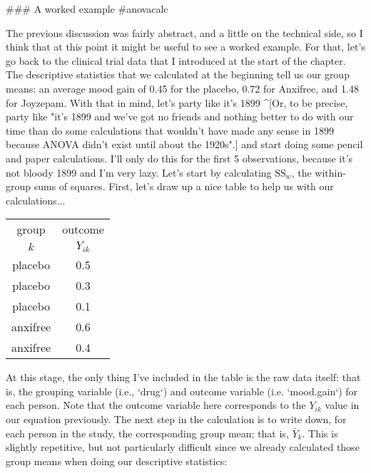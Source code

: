 ### A worked example {#anovacalc}


The previous discussion was fairly abstract, and a little on the technical side, so I think that at this point it might be useful to see a worked example. For that, let's go back to the clinical trial data that I introduced at the start of the chapter. The descriptive statistics that we calculated at the beginning tell us our group means: an average mood gain of 0.45 for the placebo, 0.72 for Anxifree, and 1.48 for Joyzepam. With that in mind, let's party like it's 1899 ^[Or, to be precise, party like "it's 1899 and we've got no friends and nothing better to do with our time than do some calculations that wouldn't have made any sense in 1899 because ANOVA didn't exist until about the 1920s".] and  start doing some pencil and paper calculations. I'll only do this for the first 5 observations, because it's not bloody 1899 and I'm very lazy. Let's start by calculating $\mbox{SS}_{w}$, the within-group sums of squares. First, let's draw up a nice table to help us with our calculations... 

\small
\vspace*{6pt}
\begin{tabular}{c|c} %
{group} & {outcome}  \\ %
  $k$ &  $Y_{ik}$ \\ \hline %
{placebo}  & {0.5}  \\%
{placebo}  & {0.3} \\%
{placebo}  &  {0.1}\\%
{anxifree}  & {0.6} \\%
{anxifree}  & {0.4}\\%
\end{tabular}
\vspace*{6pt}
\normalsize


At this stage, the only thing I've included in the table is the raw data itself: that is, the grouping variable (i.e., `drug`) and outcome variable (i.e. `mood.gain`) for each person. Note that the outcome variable here corresponds to the $Y_{ik}$ value in our equation previously. The next step in the calculation is to write down, for each person in the study, the corresponding group mean; that is, $\bar{Y}_k$. This is slightly repetitive, but not particularly difficult since we already calculated those group means when doing our descriptive statistics:

